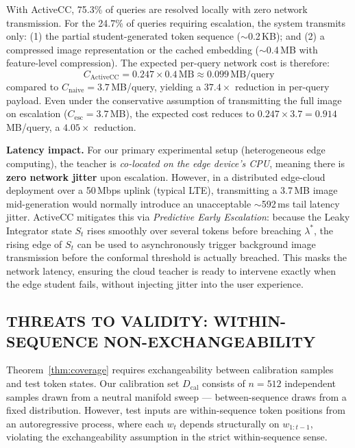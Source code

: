\documentclass{ieeetmlcn}
\begin{document}
With ActiveCC, 75.3\% of queries are resolved locally with zero network transmission. For the 24.7\% of queries requiring escalation, the system transmits only: (1) the partial student-generated token sequence ($\sim$0.2\,KB); and (2) a compressed image representation or the cached embedding ($\sim$0.4\,MB with feature-level compression). The expected per-query network cost is therefore:
\begin{equation}
  C_{\text{ActiveCC}} = 0.247 \times 0.4\,\text{MB} \approx 0.099\,\text{MB/query}
\end{equation}
compared to $C_{\text{naive}} = 3.7$\,MB/query, yielding a $\mathbf{37.4\times}$ reduction in per-query payload. Even under the conservative assumption of transmitting the full image on escalation ($C_{\text{esc}} = 3.7$\,MB), the expected cost reduces to $0.247 \times 3.7 = 0.914$\,MB/query, a $\mathbf{4.05\times}$ reduction.

\textbf{Latency impact.} For our primary experimental setup (heterogeneous edge computing), the teacher is \emph{co-located on the edge device's CPU}, meaning there is \textbf{zero network jitter} upon escalation. However, in a distributed edge-cloud deployment over a 50\,Mbps uplink (typical LTE), transmitting a 3.7\,MB image mid-generation would normally introduce an unacceptable $\sim$592\,ms tail latency jitter. ActiveCC mitigates this via \emph{Predictive Early Escalation}: because the Leaky Integrator state $S_t$ rises smoothly over several tokens before breaching $\lambda^*$, the rising edge of $S_t$ can be used to asynchronously trigger background image transmission before the conformal threshold is actually breached. This masks the network latency, ensuring the cloud teacher is ready to intervene exactly when the edge student fails, without injecting jitter into the user experience.

\subsection{THREATS TO VALIDITY: WITHIN-SEQUENCE NON-EXCHANGEABILITY}
\label{sec:exchangeability}
Theorem~\ref{thm:coverage} requires exchangeability between calibration samples and test token states. Our calibration set $D_{\text{cal}}$ consists of $n=512$ independent samples drawn from a neutral manifold sweep --- between-sequence draws from a fixed distribution. However, test inputs are within-sequence token positions from an autoregressive process, where each $w_t$ depends structurally on $w_{1:t-1}$, violating the exchangeability assumption in the strict within-sequence sense.
\end{document}

